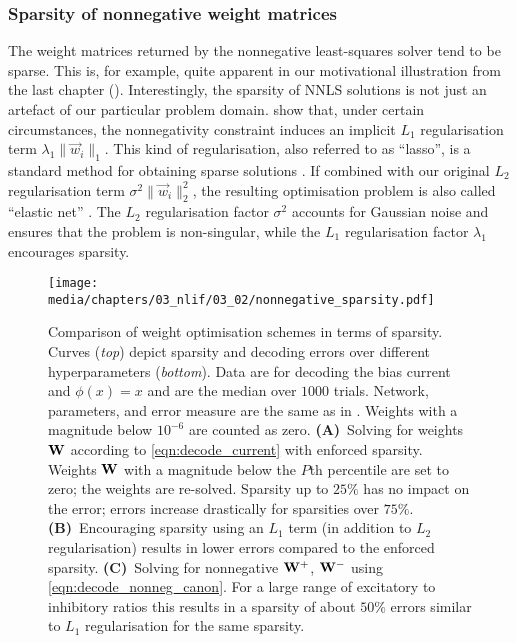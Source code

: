 \pagebreak

\subsubsection{Sparsity of nonnegative weight matrices}
The weight matrices returned by the nonnegative least-squares solver tend to be sparse.
This is, for example, quite apparent in our motivational illustration from the last chapter ().
Interestingly, the sparsity of NNLS solutions is not just an artefact of our particular problem domain.
 show that, under certain circumstances, the nonnegativity constraint induces an implicit $L_1$ regularisation term $\lambda_1 \|\vec w_i\|_1$.
This kind of regularisation, also referred to as \enquote{lasso}, is a standard method for obtaining sparse solutions \citep[Section~3.1.4]{bishop2006pattern}.
If combined with our original $L_2$ regularisation term $\sigma^2 \| \vec w_i \|_2^2$, the resulting optimisation problem is also called \enquote{elastic net} \citep{zou2005regularization}.
The $L_2$ regularisation factor $\sigma^2$ accounts for Gaussian noise and ensures that the problem is non-singular, while the $L_1$ regularisation factor $\lambda_1$ encourages sparsity.

\begin{figure}
	\texttt{[image: media/chapters/03\_nlif/03\_02/nonnegative\_sparsity.pdf]}%
	{\label{fig:nonnegative_sparsity_a}}%
	{\label{fig:nonnegative_sparsity_b}}%
	{\label{fig:nonnegative_sparsity_c}}%
	\caption[Comparison of weight optimisation schemes in terms of sparsity]{Comparison of weight optimisation schemes in terms of sparsity.
	Curves (\emph{top}) depict sparsity and decoding errors over different hyperparameters (\emph{bottom}).
	Data are for decoding the bias current and $\phi(x) = x$ and are the median over $1000$ trials.
	Network, parameters, and error measure are the same as in .
	Weights with a magnitude below $10^{-6}$ are counted as zero.
	\textbf{(A)}~Solving for weights $\mathbf{W}$ according to \cref{eqn:decode_current} with enforced sparsity.
	Weights $\mathbf{W}$ with a magnitude below the $P$th percentile are set to zero; the weights are re-solved.
	Sparsity up to $25\%$ has no impact on the error; errors increase drastically for sparsities over $75\%$.
	\textbf{(B)}~Encouraging sparsity using an $L_1$ term (in addition to $L_2$ regularisation) results in lower errors compared to the enforced sparsity.
	\textbf{(C)}~Solving for nonnegative $\mathbf{W}^+$, $\mathbf{W}^-$ using \cref{eqn:decode_nonneg_canon}.
	For a large range of excitatory to inhibitory ratios this results in a sparsity of about $50\%$ errors similar to $L_1$ regularisation for the same sparsity.
	}
	\label{fig:nonnegative_sparsity}
\end{figure}

